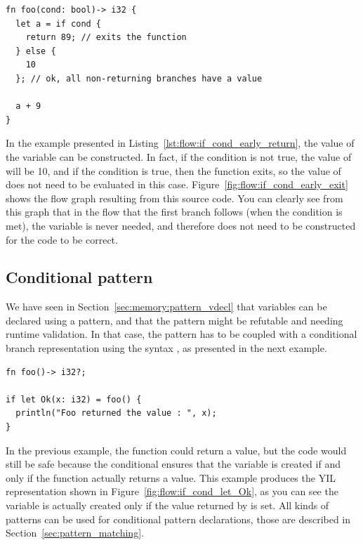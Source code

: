 


\begin{lstlisting}[style=coloredverbatim, caption=Early return in \token{if} condition, label=lst:flow:if_cond_early_return]
fn foo(cond: bool)-> i32 {
  let a = if cond {
    return 89; // exits the function
  } else {
    10
  }; // ok, all non-returning branches have a value

  a + 9
}
\end{lstlisting}

In the example presented in Listing~\ref{lst:flow:if_cond_early_return}, the value of
the variable  can be constructed. In fact, if the condition is not
true, the value of  will be 10, and if the condition is true, then the
function exits, so the value of  does not need to be evaluated in this
case. Figure~\ref{fig:flow:if_cond_early_exit} shows the flow graph resulting from
this source code. You can clearly see from this graph that in the flow that the
first branch follows (when the condition is met), the variable  is
never needed, and therefore does not need to be constructed for the code to be
correct.


\subsection{Conditional pattern}
\label{sec:flow:cond_pattern}

We have seen in Section~\ref{sec:memory:pattern_vdecl} that variables can be declared
using a pattern, and that the pattern might be refutable and needing runtime
validation. In that case, the pattern has to be coupled with a conditional
branch representation using the syntax , as
presented in the next example.



\begin{lstlisting}[style=coloredverbatim, label=lst:flow:if_cond_let_Ok, caption=Example of conditional pattern]
fn foo()-> i32?;

if let Ok(x: i32) = foo() {
  println("Foo returned the value : ", x);
}
\end{lstlisting}

In the previous example, the function  could return a 
value, but the code would still be safe because the conditional ensures that the
variable  is created if and only if the function actually returns a
value. This example produces the YIL representation shown in
Figure~\ref{fig:flow:if_cond_let_Ok}, as you can see the variable  is
actually created only if the value returned by  is set. All kinds of
patterns can be used for conditional pattern declarations, those are described
in Section~\ref{sec:pattern_matching}.


